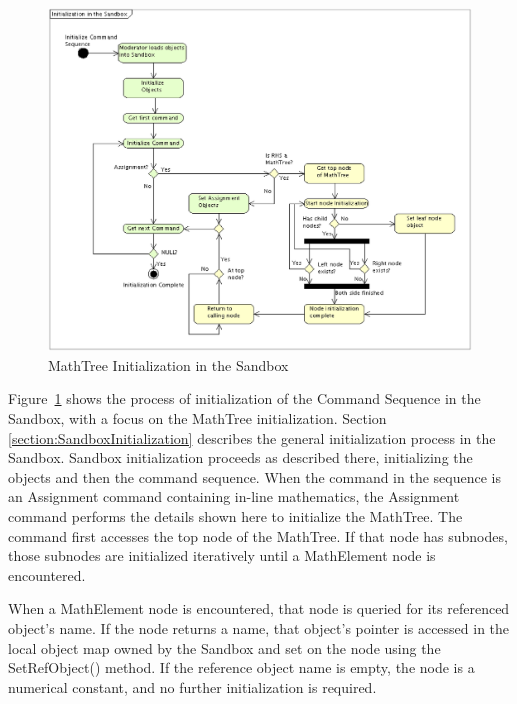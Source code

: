 \begin{figure}
\begin{center}
\includegraphics[scale=0.5]{Images/MathTreeInitialization.eps}
\caption{\label{figure:MathInitialization}MathTree Initialization in the
Sandbox}
\end{center}
\end{figure}

Figure~\ref{figure:MathInitialization} shows the process of initialization of
the Command Sequence in the Sandbox, with a focus on the MathTree
initialization.  Section \ref{section:SandboxInitialization} describes the
general initialization process in the Sandbox.  Sandbox initialization proceeds
as described there, initializing the objects and then the command sequence.
When the command in the sequence is an Assignment command containing in-line
mathematics, the Assignment command performs the details shown here to
initialize the MathTree.  The command first accesses the top node of the
MathTree.  If that node has subnodes, those subnodes are initialized
iteratively until a MathElement node is encountered.

When a MathElement node is encountered, that node is queried for its referenced
object's name.  If the node returns a name, that object's pointer is accessed
in the local object map owned by the Sandbox and set on the node using the
SetRefObject() method.  If the reference object name is empty, the node is a
numerical constant, and no further initialization is required.

